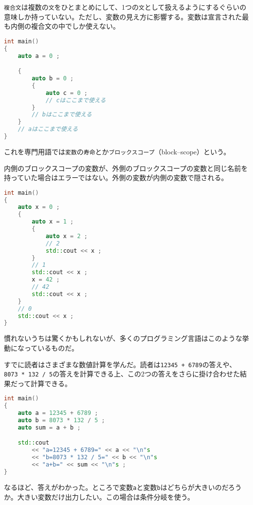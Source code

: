 \texttt{複合文}は複数の\texttt{文}をひとまとめにして、1つの\texttt{文}として扱えるようにするぐらいの意味しか持っていない。ただし、変数の見え方に影響する。変数は宣言された最も内側の複合文の中でしか使えない。

\begin{lstlisting}[language={C++}]
int main()
{
    auto a = 0 ;

    {
        auto b = 0 ;
        {
            auto c = 0 ;
            // cはここまで使える
        }
        // bはここまで使える
    }
    // aはここまで使える
}
\end{lstlisting}

これを専門用語では\texttt{変数}の\texttt{寿命}とか\texttt{ブロックスコープ}（block--scope）という。

内側のブロックスコープの変数が、外側のブロックスコープの変数と同じ名前を持っていた場合はエラーではない。外側の変数が内側の変数で隠される。

\begin{lstlisting}[language={C++}]
int main()
{
    auto x = 0 ;
    {
        auto x = 1 ;
        {
            auto x = 2 ;
            // 2
            std::cout << x ;
        }
        // 1
        std::cout << x ;
        x = 42 ;
        // 42
        std::cout << x ;
    }
    // 0
    std::cout << x ;
}
\end{lstlisting}

慣れないうちは驚くかもしれないが、多くのプログラミング言語はこのような挙動になっているものだ。

\clearpage
{}

すでに読者はさまざまな数値計算を学んだ。読者は\texttt{12345 + 6789}の答えや、\texttt{8073 * 132 / 5}の答えを計算できる上、この2つの答えをさらに掛け合わせた結果だって計算できる。

\begin{lstlisting}[language={C++}]
int main()
{
    auto a = 12345 + 6789 ;
    auto b = 8073 * 132 / 5 ;
    auto sum = a + b ;

    std::cout
        << "a=12345 + 6789=" << a << "\n"s
        << "b=8073 * 132 / 5=" << b << "\n"s
        << "a+b=" << sum << "\n"s ;
}
\end{lstlisting}

なるほど、答えがわかった。ところで変数\texttt{a}と変数\texttt{b}はどちらが大きいのだろうか。大きい変数だけ出力したい。この場合は条件分岐を使う。

